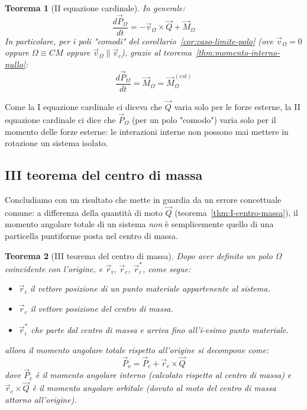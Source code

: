 \documentclass[11pt, a4paper, openright]{book}
\theoremstyle{plain}
\newtheorem{theorem}{Teorema}[section]
\theoremstyle{definition}
\begin{document}
\begin{theorem}[II equazione cardinale]
\label{thm:II-cardinale}
In generale:
\begin{equation}
    \frac{d\vec{P}_\Omega}{dt} = -\vec{v}_\Omega \times \vec{Q} + \vec{M}_{\Omega}
\end{equation}
In particolare, per i poli "comodi" del corollario~\ref{cor:caso-limite-polo}
(ove $\vec{v}_\Omega = 0$ oppure $\Omega \equiv CM$ oppure
$\vec{v}_\Omega \parallel \vec{v}_c$), grazie al
teorema~\ref{thm:momento-interno-nullo}:
\begin{equation}
    \frac{d\vec{P}_\Omega}{dt} = \vec{M}_\Omega = \vec{M}_\Omega^{(est)}
\end{equation}
\end{theorem}

Come la I equazione cardinale ci diceva che $\vec{Q}$ varia solo per le
forze esterne, la II equazione cardinale ci dice che $\vec{P}_\Omega$
(per un polo "comodo") varia solo per il momento delle forze esterne:
le interazioni interne non possono mai mettere in rotazione un sistema
isolato.

\subsection{III teorema del centro di massa}
\label{subsec:III-centro-massa}

Concludiamo con un risultato che mette in guardia da un errore concettuale
comune: a differenza della quantità di moto $\vec{Q}$ (teorema~\ref{thm:I-centro-massa}),
il momento angolare totale di un sistema \emph{non} è semplicemente
quello di una particella puntiforme posta nel centro di massa.

\begin{theorem}[III teorema del centro di massa]
\label{thm:III-centro-massa}
Dopo aver definito un polo $\Omega$ coincidente con l'origine, e
$\vec{r}_i$, $\vec{r}_c$, $\vec{r}_i^*$, come segue:
\begin{itemize}
    \item $\vec{r}_i$ il vettore posizione di un punto materiale appartenente al sistema.
    \item $\vec{r}_c$ il vettore posizione del centro di massa.
    \item $\vec{r}_i^*$ che parte dal centro di massa e arriva fino all'i-esimo punto materiale.
\end{itemize}
allora il momento angolare totale rispetto all'origine si decompone come:
\begin{equation}
    \vec{P}_o = \vec{P}_c + \vec{r}_c \times \vec{Q}
\end{equation}
dove $\vec{P}_c$ è il momento angolare \emph{interno} (calcolato rispetto
al centro di massa) e $\vec{r}_c \times \vec{Q}$ è il momento angolare
\emph{orbitale} (dovuto al moto del centro di massa attorno
all'origine).
\end{theorem}
\end{document}

